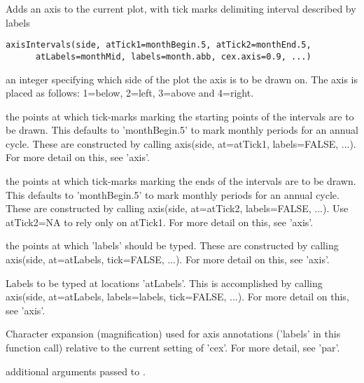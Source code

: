 \begin{Description}\relax
Adds an axis to the current plot, with tick marks delimiting interval
described by labels
\end{Description}
\begin{Usage}
\begin{verbatim}
axisIntervals(side, atTick1=monthBegin.5, atTick2=monthEnd.5,
      atLabels=monthMid, labels=month.abb, cex.axis=0.9, ...)
\end{verbatim}
\end{Usage}
\begin{Arguments}
\begin{ldescription}
\item[\code{side}] an integer specifying which side of the plot the axis is to
be drawn on.  The axis is placed as follows: 1=below, 2=left,
3=above and 4=right.

\item[\code{atTick1}] the points at which tick-marks marking the starting points of the
intervals are to be drawn.  This defaults to 'monthBegin.5' to mark
monthly periods for an annual cycle.  These are constructed by
calling axis(side, at=atTick1, labels=FALSE, ...).  For more detail
on this, see 'axis'.  

\item[\code{atTick2}] the points at which tick-marks marking the ends of the
intervals are to be drawn.  This defaults to 'monthBegin.5' to mark
monthly periods for an annual cycle.  These are constructed by
calling axis(side, at=atTick2, labels=FALSE, ...).  Use atTick2=NA
to rely only on atTick1.  For more detail
on this, see 'axis'.  

\item[\code{atLabels}] the points at which 'labels' should be typed.  These are constructed
by calling axis(side, at=atLabels, tick=FALSE, ...).  For more detail
on this, see 'axis'.  

\item[\code{labels}] Labels to be typed at locations 'atLabels'.  This is accomplished by
calling axis(side, at=atLabels, labels=labels, tick=FALSE, ...).
For more detail on this, see 'axis'.   

\item[\code{cex.axis}] Character expansion (magnification) used for axis annotations
('labels' in this function call) relative
to the current setting of 'cex'.  For more detail, see 'par'.    

\item[\code{... }] additional arguments passed to 
. 

\end{ldescription}
\end{Arguments}
